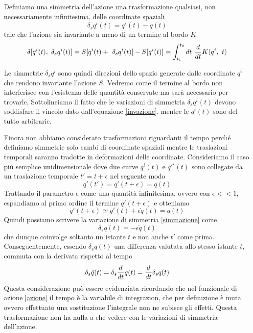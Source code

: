 \begin{definition}
    Definiamo una simmetria dell'azione una trasformazione qualsiasi, non necessariamente infinitesima, delle coordinate spaziali 
\begin{equation}\label{simmazione}
    \delta_s q^i(t) = q'(t) - q(t)
\end{equation} 
    tale che l'azione sia invariante a meno di un termine al bordo $K$
\begin{equation} \label{invazione}
    \delta[q^i(t), ~\delta_s q^i(t)] = S[q^i(t) + ~\delta_s q^i(t)] - S[q^i(t)] = \int_{t_1}^{t_2}dt~ \frac{d}{dt} K(q^i, ~t)
\end{equation}
\end{definition}    
    Le simmetrie $\delta_s q^i$ sono quindi direzioni dello spazio generate dalle coordinate $q^i$ che rendono invariante l'azione $S$. Vedremo come il termine al bordo non interferisce con l'esistenza delle quantità conservate ma sarà necessario per trovarle. Sottolineiamo il fatto che le variazioni di simmetria $\delta_s q^i(t)$ devono soddisfare il vincolo dato dall'equazione \eqref{invazione}, mentre le $q^i(t)$ sono del tutto arbitrarie. 

    Finora non abbiamo considerato trasformazioni riguardanti il tempo perché definiamo simmetrie solo cambi di coordinate spaziali mentre le traslazioni temporali saranno tradotte in deformazioni delle coordinate. Consideriamo il caso più semplice unidimensionale dove due curve $q^i(t)$ e $q'^i(t)$ sono collegate da un traslazione temporale $t' = t + \epsilon$ nel seguente modo 
\begin{equation*}
    q'(t') = q'(t + \epsilon) = q(t)
\end{equation*} 
    Trattando il parametro $\epsilon$ come una quantità infinitesima, ovvero con $\epsilon << 1$, espandiamo al primo ordine il termine $q'(t + \epsilon)$ e otteniamo
\begin{equation*}
    q'(t + \epsilon) \simeq q'(t) + \epsilon \dot q(t) = q(t)
\end{equation*}     
    Quindi possiamo scrivere la variazione di simmetria \eqref{simmazione} come 
\begin{equation}\label{simmtempo}
    \delta_s q(t) = - \epsilon \dot q(t)
\end{equation}
    che dunque coinvolge soltanto un istante $t$ e non anche $t'$ come prima. Conseguentemente, essendo $\delta_s q(t)$ una differenza valutata allo stesso istante $t$, commuta con la derivata rispetto al tempo
\begin{equation}\label{commutatore}
    \delta_s \dot q(t) = \delta_s \frac{d}{dt} q(t) = \frac{d}{dt} \delta_s q(t) 
\end{equation}
    Questa considerazione può essere evidenziata ricordando che nel funzionale di azione \eqref{azione} il tempo è la variabile di integrazion, che per definizione è muta ovvero effettuato una sostituzione l'integrale non ne subisce gli effetti. Questa trasformazione non ha nulla a che vedere con le variazioni di simmetria dell'azione. 

